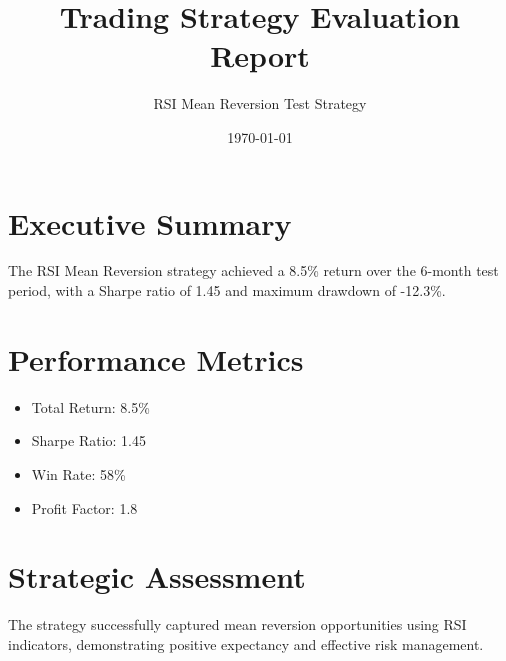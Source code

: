 \documentclass{article}
\title{Trading Strategy Evaluation Report}
\author{RSI Mean Reversion Test Strategy}
\date{\today}
\begin{document}
\maketitle

\section{Executive Summary}
The RSI Mean Reversion strategy achieved a 8.5\% return over the 6-month test period,
with a Sharpe ratio of 1.45 and maximum drawdown of -12.3\%.

\section{Performance Metrics}
\begin{itemize}
\item Total Return: 8.5\%
\item Sharpe Ratio: 1.45
\item Win Rate: 58\%
\item Profit Factor: 1.8
\end{itemize}

\section{Strategic Assessment}
The strategy successfully captured mean reversion opportunities using RSI indicators,
demonstrating positive expectancy and effective risk management.
\end{document}
